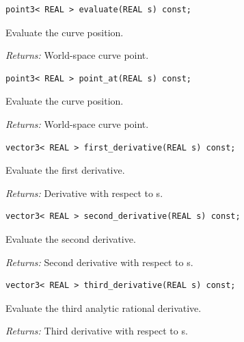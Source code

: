 \par\noindent\begin{minipage}{\linewidth}
\begin{lstlisting}[style=apireference]
point3< REAL > evaluate(REAL s) const;
\end{lstlisting}
{\footnotesize Evaluate the curve position.\par}
{\footnotesize\textit{Returns:} World-space curve point.\par}
\end{minipage}\par\vspace{1pt}
\par\noindent\begin{minipage}{\linewidth}
\begin{lstlisting}[style=apireference]
point3< REAL > point_at(REAL s) const;
\end{lstlisting}
{\footnotesize Evaluate the curve position.\par}
{\footnotesize\textit{Returns:} World-space curve point.\par}
\end{minipage}\par\vspace{1pt}
\par\noindent\begin{minipage}{\linewidth}
\begin{lstlisting}[style=apireference]
vector3< REAL > first_derivative(REAL s) const;
\end{lstlisting}
{\footnotesize Evaluate the first derivative.\par}
{\footnotesize\textit{Returns:} Derivative with respect to s.\par}
\end{minipage}\par\vspace{1pt}
\par\noindent\begin{minipage}{\linewidth}
\begin{lstlisting}[style=apireference]
vector3< REAL > second_derivative(REAL s) const;
\end{lstlisting}
{\footnotesize Evaluate the second derivative.\par}
{\footnotesize\textit{Returns:} Second derivative with respect to s.\par}
\end{minipage}\par\vspace{1pt}
\par\noindent\begin{minipage}{\linewidth}
\begin{lstlisting}[style=apireference]
vector3< REAL > third_derivative(REAL s) const;
\end{lstlisting}
{\footnotesize Evaluate the third analytic rational derivative.\par}
{\footnotesize\textit{Returns:} Third derivative with respect to s.\par}
\end{minipage}\par\vspace{1pt}
